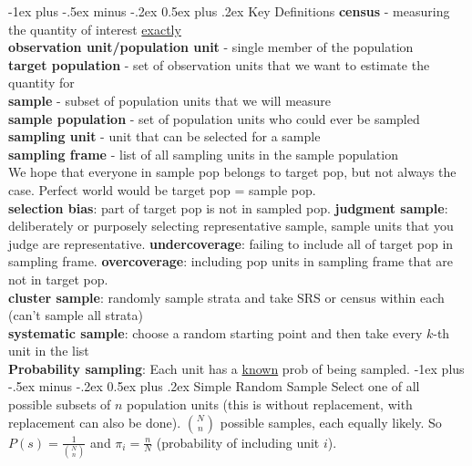 \documentclass[10pt,landscape]{article}
\makeatletter
\renewcommand{\section}{\@startsection{section}{1}{0mm}%
                                {-1ex plus -.5ex minus -.2ex}%
                                {0.5ex plus .2ex}%
                                {\normalfont\large\bfseries}}
\makeatother
\begin{document}
\begin{multicols*}{3}
\section{Key Definitions}
\textbf{census} - measuring the quantity of interest
\underline{exactly}
\\ \textbf{observation unit/population unit} - single member of the
population
\\ \textbf{target population} - set of observation units that we want
to estimate the quantity for
\\ \textbf{sample} - subset of population units that we will measure
\\ \textbf{sample population} - set of population units who could ever
be sampled
\\ \textbf{sampling unit} - unit that can be selected for a sample
\\ \textbf{sampling frame} - list of all sampling units in the sample population
\\ We hope that everyone in sample pop belongs to target pop, but not
always the case. Perfect world would be target pop = sample pop.
\\ \textbf{selection bias}: part of target pop is not in sampled
pop. \textbf{judgment sample}: deliberately or purposely selecting
representative sample, sample units that you judge are
representative. \textbf{undercoverage}: failing to include all of
target pop in sampling frame. \textbf{overcoverage}: including pop
units in sampling frame that are not in target pop.
\\ \textbf{cluster sample}: randomly sample strata and take SRS or
census within each (can't sample all strata)
\\ \textbf{systematic sample}: choose a random starting point and then
take every $k$-th unit in the list
\\ \textbf{Probability sampling}: Each unit has a \underline{known}
prob of being sampled.
\section{Simple Random Sample} Select one of all possible subsets of
$n$ population units (this is without replacement, with replacement
can also be done). $\binom{N}{n}$ possible samples, each equally
likely. So $P(s) = \frac{1}{\binom{N}{n}}$ and $\pi_i = \frac{n}{N}$
(probability of including unit $i$).

\end{multicols*}
\end{document}
